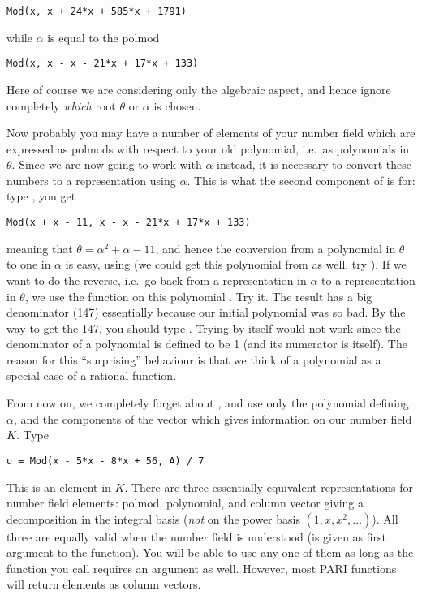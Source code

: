 \centerline{\tt Mod(x, x + 24*x + 585*x + 1791)}

\noindent while $\alpha$ is equal to the polmod

\centerline{\tt Mod(x, x - x - 21*x + 17*x + 133)}

\noindent Here of course we are considering only the algebraic aspect, and
hence ignore completely \emph{which} root $\theta$ or $\alpha$ is chosen.

Now probably you may have a number of elements of your number field which are
expressed as polmods with respect to your old polynomial, i.e.~as
polynomials in $\theta$. Since we are now going to work with $\alpha$
instead, it is necessary to convert these numbers to a representation using
$\alpha$. This is what the second component of  is for: type
, you get

\centerline{\tt Mod(x + x - 11, x - x - 21*x +
17*x + 133)}

\noindent meaning that $\theta = \alpha^2+\alpha-11$, and hence the conversion
from a polynomial in $\theta$ to one in $\alpha$ is easy, using 
(we could get this polynomial from  as well, try
). If we want to do the reverse, i.e.~go back from a
representation in $\alpha$ to a representation in $\theta$, we use the
function  on this polynomial . Try it. The result
has a big denominator (147) essentially because our initial polynomial
 was so bad. By the way to get the 147, you should type
. Trying  by itself would not
work since the denominator of a polynomial is defined to be 1 (and its
numerator is itself). The reason for this ``surprising'' behaviour is that we
think of a polynomial as a special case of a rational function. \smallskip

From now on, we completely forget about , and use only the polynomial
 defining $\alpha$, and the components of the vector  which
gives information on our number field $K$. Type

\centerline{\tt u = Mod(x - 5*x - 8*x + 56, A) / 7}

This is an element in $K$. There are three essentially equivalent
representations for number field elements: polmod, polynomial, and column
vector giving a decomposition in the integral basis  (\emph{not} on
the power basis $(1,x,x^2,\dots)$). All three are equally valid when the
number field is understood (is given as first argument to the function).
You will be able to use any one of them as long as the function you call
requires an  argument as well. However, most PARI functions will
return elements as column vectors.

